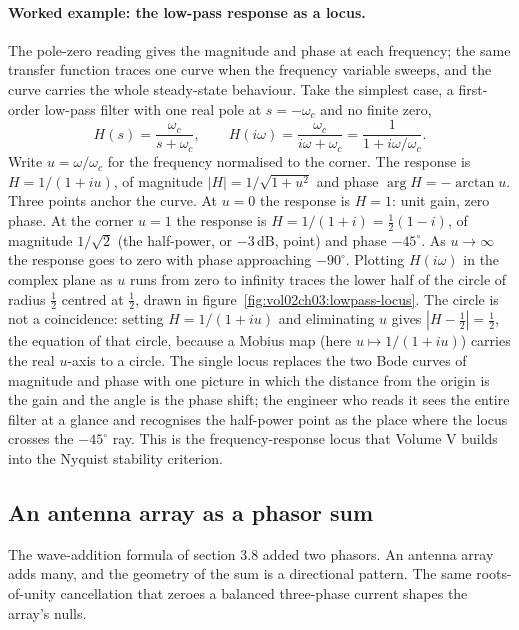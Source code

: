 \paragraph{Worked example: the low-pass response as a locus.} The
pole-zero reading gives the magnitude and phase at each frequency; the
same transfer function traces one curve when the frequency variable
sweeps, and the curve carries the whole steady-state behaviour. Take
the simplest case, a first-order low-pass filter with one real pole at
$s = -\omega_c$ and no finite zero,
\[
H(s) = \frac{\omega_c}{s + \omega_c}, \qquad
H(i\omega) = \frac{\omega_c}{i\omega + \omega_c}
= \frac{1}{1 + i\omega/\omega_c}.
\]
Write $u = \omega/\omega_c$ for the frequency normalised to the corner.
The response is $H = 1/(1 + iu)$, of magnitude $|H| = 1/\sqrt{1 + u^{2}}$
and phase $\arg H = -\arctan u$. Three points anchor the curve. At
$u = 0$ the response is $H = 1$: unit gain, zero phase. At the corner
$u = 1$ the response is $H = 1/(1 + i) = \tfrac{1}{2}(1 - i)$, of
magnitude $1/\sqrt 2$ (the half-power, or $-3\,$dB, point) and phase
$-45^{\circ}$. As $u \to \infty$ the response goes to zero with phase
approaching $-90^{\circ}$. Plotting $H(i\omega)$ in the complex plane as
$u$ runs from zero to infinity traces the lower half of the circle of
radius $\tfrac{1}{2}$ centred at $\tfrac{1}{2}$, drawn in
figure~\ref{fig:vol02ch03:lowpass-locus}. The circle is not a
coincidence: setting $H = 1/(1 + iu)$ and eliminating $u$ gives
$|H - \tfrac{1}{2}| = \tfrac{1}{2}$, the equation of that circle,
because a Mobius map (here $u \mapsto 1/(1 + iu)$) carries the real
$u$-axis to a circle. The single locus replaces the two Bode curves of
magnitude and phase with one picture in which the distance from the
origin is the gain and the angle is the phase shift; the engineer who
reads it sees the entire filter at a glance and recognises the
half-power point as the place where the locus crosses the $-45^{\circ}$
ray. This is the frequency-response locus that Volume V builds into the
Nyquist stability criterion.



\subsection{An antenna array as a phasor sum}

The wave-addition formula of section 3.8 added two phasors. An antenna
array adds many, and the geometry of the sum is a directional pattern.
The same roots-of-unity cancellation that zeroes a balanced three-phase
current shapes the array's nulls.


